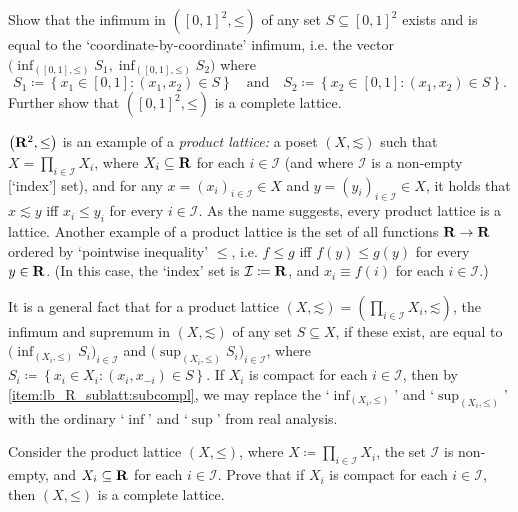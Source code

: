 \begin{namedthm}
	\label{exercise:lb-R2_lat_a-d}
	Show that the infimum in $\left( [0,1]^2, \mathord{\leq} \right)$ of any set $S \subseteq [0,1]^2$ exists and is equal to the `coordinate-by-coordinate' infimum, i.e. the vector $\bigl( \inf_{([0,1],\mathord{\leq})} S_1, \inf_{([0,1],\mathord{\leq})} S_2 \bigr)$ where
	\begin{equation*}
		S_1 \coloneqq \left\{ x_1 \in [0,1] : (x_1,x_2) \in S \right\}
		\quad \text{and} \quad
		S_2 \coloneqq \left\{ x_2 \in [0,1] : (x_1,x_2) \in S \right\} .
	\end{equation*}
	Further show that $\left( [0,1]^2, \mathord{\leq} \right)$ is a complete lattice.
\end{namedthm}

$\left( \R^2, \mathord{\leq} \right)$ is an example of a \emph{product lattice:} a poset $(X,\mathord{\lesssim})$ such that $X = \prod_{i \in \mathcal{I}} X_i$, where $X_i \subseteq \mathbf{R}$ for each $i \in \mathcal{I}$ (and where $\mathcal{I}$ is a non-empty [`index'] set), and for any $x = (x_i)_{i \in \mathcal{I}} \in X$ and $y = (y_i)_{i \in \mathcal{I}} \in X$, it holds that $x \lesssim y$ iff $x_i \leq y_i$ for every $i \in \mathcal{I}$. As the name suggests, every product lattice is a lattice. Another example of a product lattice is the set of all functions $\mathbf{R} \to \mathbf{R}$ ordered by `pointwise inequality' $\leq$, i.e. $f \leq g$ iff $f(y) \leq g(y)$ for every $y \in \mathbf{R}$. (In this case, the `index' set is $\mathcal{I} \coloneqq \mathbf{R}$, and $x_i \equiv f(i)$ for each $i \in \mathcal{I}$.)

It is a general fact that for a product lattice $(X,\mathord{\lesssim}) = \left( \prod_{i \in \mathcal{I}} X_i, \mathord{\lesssim} \right)$, the infimum and supremum in $(X,\mathord{\lesssim})$ of any set $S \subseteq X$, if these exist, are equal to $\bigl( \inf_{(X_i,\mathord{\leq})} S_i \bigr)_{i \in \mathcal{I}}$ and $\bigl( \sup_{(X_i,\mathord{\leq})} S_i \bigr)_{i \in \mathcal{I}}$, where $S_i \coloneqq \left\{ x_i \in X_i : (x_i,x_{-i}) \in S \right\}$.
If $X_i$ is compact for each $i \in \mathcal{I}$, then by \ref{item:lb_R_sublatt:subcompl}, we may replace the `$\inf_{(X_i,\mathord{\leq})}$' and `$\sup_{(X_i,\mathord{\leq})}$' with the ordinary `$\inf$' and `$\sup$' from real analysis.

\begin{exercise}
	\label{exercise:product_compl_lattice}
	Consider the product lattice $(X,\mathord{\leq})$, where $X \coloneqq \prod_{i \in \mathcal{I}} X_i$, the set $\mathcal{I}$ is non-empty, and $X_i \subseteq \mathbf{R}$ for each $i \in \mathcal{I}$. Prove that if $X_i$ is compact for each $i \in \mathcal{I}$, then $(X,\mathord{\leq})$ is a complete lattice.
\end{exercise}

